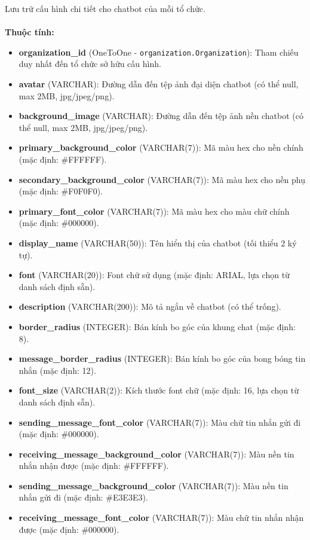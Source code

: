  Lưu trữ cấu hình chi tiết cho chatbot của mỗi tổ chức. \\\\
\indent\textbf{Thuộc tính:}
\begin{itemize}
    \item \textbf{organization\_id} (OneToOne - \texttt{organization.Organization}): Tham chiếu duy nhất đến tổ chức sở hữu cấu hình.
    \item \textbf{avatar} (VARCHAR): Đường dẫn đến tệp ảnh đại diện chatbot (có thể null, max 2MB, jpg/jpeg/png).
    \item \textbf{background\_image} (VARCHAR): Đường dẫn đến tệp ảnh nền chatbot (có thể null, max 2MB, jpg/jpeg/png).
    \item \textbf{primary\_background\_color} (VARCHAR(7)): Mã màu hex cho nền chính (mặc định: \#FFFFFF).
    \item \textbf{secondary\_background\_color} (VARCHAR(7)): Mã màu hex cho nền phụ (mặc định: \#F0F0F0).
    \item \textbf{primary\_font\_color} (VARCHAR(7)): Mã màu hex cho màu chữ chính (mặc định: \#000000).
    \item \textbf{display\_name} (VARCHAR(50)): Tên hiển thị của chatbot (tối thiểu 2 ký tự).
    \item \textbf{font} (VARCHAR(20)): Font chữ sử dụng (mặc định: ARIAL, lựa chọn từ danh sách định sẵn).
    \item \textbf{description} (VARCHAR(200)): Mô tả ngắn về chatbot (có thể trống).
    \item \textbf{border\_radius} (INTEGER): Bán kính bo góc của khung chat (mặc định: 8).
    \item \textbf{message\_border\_radius} (INTEGER): Bán kính bo góc của bong bóng tin nhắn (mặc định: 12).
    \item \textbf{font\_size} (VARCHAR(2)): Kích thước font chữ (mặc định: 16, lựa chọn từ danh sách định sẵn).
    \item \textbf{sending\_message\_font\_color} (VARCHAR(7)): Màu chữ tin nhắn gửi đi (mặc định: \#000000).
    \item \textbf{receiving\_message\_background\_color} (VARCHAR(7)): Màu nền tin nhắn nhận được (mặc định: \#FFFFFF).
    \item \textbf{sending\_message\_background\_color} (VARCHAR(7)): Màu nền tin nhắn gửi đi (mặc định: \#E3E3E3).
    \item \textbf{receiving\_message\_font\_color} (VARCHAR(7)): Màu chữ tin nhắn nhận được (mặc định: \#000000).

\end{itemize}
